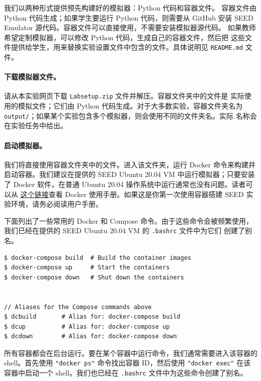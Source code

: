 我们以两种形式提供预先构建好的模拟器：Python 代码和容器文件。
容器文件由 Python 代码生成；如果学生要运行 Python 代码，则需要从 GitHub
安装 SEED Emulator 源代码。容器文件可以直接使用，不需要安装模拟器源代码。
如果教师希望定制模拟器，可以修改 Python 代码，生成自己的容器文件，然后把
这些文件提供给学生，用来替换实验设置文件中包含的文件。具体说明见
\texttt{README.md} 文件。


\paragraph{下载模拟器文件。}
请从本实验网页下载 \texttt{Labsetup.zip} 文件并解压。容器文件夹中的文件是
实际使用的模拟文件；它们由 Python 代码生成。对于大多数实验，容器文件夹名为
\texttt{output/}；如果某个实验包含多个模拟器，则会使用不同的文件夹名。实际
名称会在实验任务中给出。


\paragraph{启动模拟器。}
我们将直接使用容器文件夹中的文件。进入该文件夹，运行 Docker 命令来构建并
启动容器。我们建议在提供的 SEED Ubuntu 20.04 VM 中运行模拟器；只要安装了
Docker 软件，在普通 Ubuntu 20.04 操作系统中运行通常也没有问题。读者可以从
\href{https://github.com/seed-labs/seed-labs/blob/master/manuals/docker/SEEDManual-Container.md}
{\underline{这个链接}}查看 Docker 使用手册。如果这是你第一次使用容器搭建
SEED 实验环境，请务必阅读用户手册。


下面列出了一些常用的 Docker 和 Compose 命令。由于这些命令会被频繁使用，
我们已经在提供的 SEED Ubuntu 20.04 VM 的 \texttt{.bashrc} 文件中为它们
创建了别名。

\begin{lstlisting}
$ docker-compose build  # Build the container images
$ docker-compose up     # Start the containers
$ docker-compose down   # Shut down the containers


// Aliases for the Compose commands above
$ dcbuild       # Alias for: docker-compose build
$ dcup          # Alias for: docker-compose up
$ dcdown        # Alias for: docker-compose down
\end{lstlisting}


所有容器都会在后台运行。要在某个容器中运行命令，我们通常需要进入该容器的
shell。首先使用 \texttt{"docker ps"} 命令找出容器 ID，然后使用
\texttt{"docker exec"} 在该容器中启动一个 shell。我们也已经在
\texttt{.bashrc} 文件中为这些命令创建了别名。

